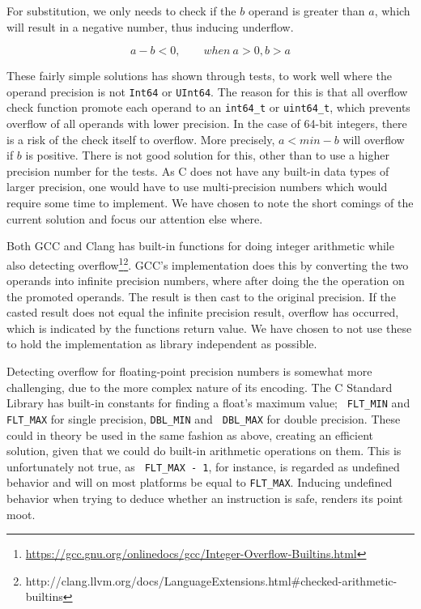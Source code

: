 For substitution, we only needs to check if the $b$ operand is greater
than $a$, which will result in a negative number, thus inducing underflow.

\begin{equation}
  a - b < 0, \qquad when\ a > 0, b > a
\end{equation}

These fairly simple solutions has shown through tests, to work well where the
operand precision is not {\tt Int64} or {\tt UInt64}. The reason for this is
that all overflow check function promote each operand to an {\tt int64\_t} or
{\tt uint64\_t}, which prevents overflow of all operands with lower
precision. In the case of 64-bit integers, there is a risk of the check itself
to overflow. More precisely, $a < min - b$ will overflow if $b$ is
positive. There is not good solution for this, other than to use a higher
precision number for the tests. As C does not have any built-in data types of
larger precision, one would have to use multi-precision numbers which would
require some time to implement. We have chosen to note the short comings of the
current solution and focus our attention else where.

Both GCC and Clang has built-in functions for doing integer arithmetic while
also detecting
overflow\footnote{\url{https://gcc.gnu.org/onlinedocs/gcc/Integer-Overflow-Builtins.html}}\footnote{http://clang.llvm.org/docs/LanguageExtensions.html\#checked-arithmetic-builtins}. GCC's
implementation does this by converting the two operands into infinite precision
numbers, where after doing the the operation on the promoted operands. The
result is then cast to the original precision. If the casted result does not
equal the infinite precision result, overflow has occurred, which is indicated
by the functions return value. We have chosen to not use these to hold the
implementation as library independent as possible.

Detecting overflow for floating-point precision numbers is somewhat more
challenging, due to the more complex nature of its encoding. The C Standard
Library has built-in constants for finding a float's maximum value; {\tt
  FLT\_MIN} and {\tt FLT\_MAX} for single precision, {\tt DBL\_MIN} and {\tt
  DBL\_MAX} for double precision. These could in theory be used in the same
fashion as above, creating an efficient solution, given that we could do
built-in arithmetic operations on them. This is unfortunately not true, as {\tt
  FLT\_MAX - 1}, for instance, is regarded as undefined behavior and will on
most platforms be equal to {\tt FLT\_MAX}. Inducing undefined behavior when
trying to deduce whether an instruction is safe, renders its point
moot.

